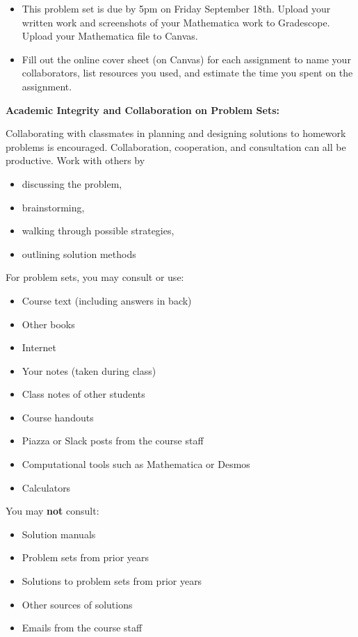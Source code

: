 \documentclass[12pt,letterpaper,noanswers]{exam}
\begin{document}
 \pdfpageheight 11in 
  \pdfpagewidth 8.5in
\begin{itemize}
\item This problem set is due by 5pm on Friday September 18th.  Upload your written work and screenshots of your Mathematica work to Gradescope.  Upload your Mathematica file to Canvas.
\item Fill out the online cover sheet (on Canvas) for each assignment to name your collaborators, list resources you used, and estimate the time you spent on the assignment.
\end{itemize}

\noindent\textbf{Academic Integrity and Collaboration on Problem Sets:}  

Collaborating with classmates in planning and designing solutions to homework problems is encouraged.  Collaboration, cooperation, and consultation can all be productive.  Work with others by 
\begin{multicols}{2}
\begin{itemize}
\itemsep-0.2em
    \item discussing the problem,
    \item brainstorming,
    \item walking through possible strategies,
    \item outlining solution methods
\end{itemize}   
\end{multicols}

\noindent For problem sets, you may consult or use:
\begin{multicols}{2}
\begin{itemize}
\itemsep-0.2em
    \item Course text (including answers in back)
    \item Other books
    \item Internet
    \item Your notes (taken during class)
    \item Class notes of other students
    \item Course handouts
    \item Piazza or Slack posts from the course staff
    \item Computational tools such as Mathematica or Desmos
    \item Calculators
\end{itemize}
\end{multicols}

\noindent You may \textbf{not} consult:
\begin{multicols}{2}
\begin{itemize}
\itemsep-0.2em
    \item Solution manuals
    \item Problem sets from prior years
    \item Solutions to problem sets from prior years
    \item Other sources of solutions
    \item Emails from the course staff
\end{itemize}
\end{multicols}
\end{document}
